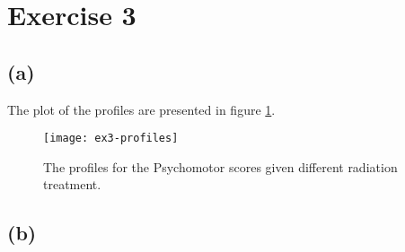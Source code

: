 \section*{Exercise 3}
\label{sec:exercise-3}

\subsection*{(a)}
\label{sec:a-2}
The plot of the profiles are presented in figure
\ref{fig:ex3-profiles}.
\begin{figure}[h]
  \centering
  \texttt{[image: ex3-profiles]}
  \caption{The profiles for the Psychomotor scores given different
    radiation treatment.}
  \label{fig:ex3-profiles}
\end{figure}

\subsection*{(b)}
\label{sec:b-2}


